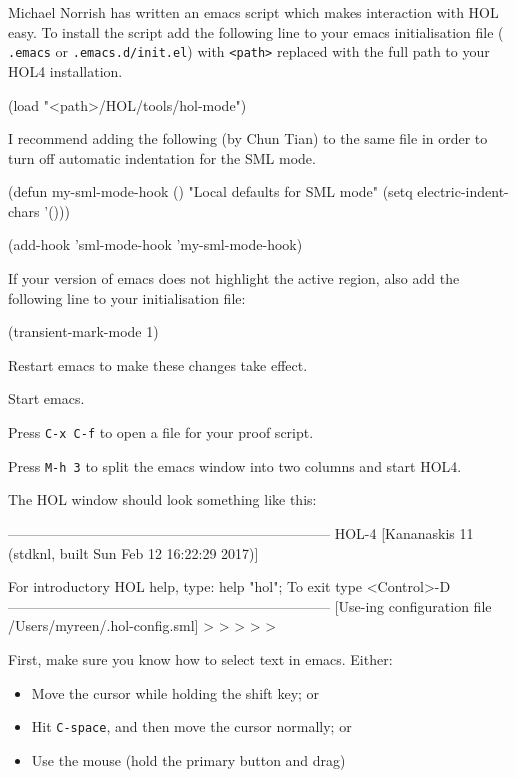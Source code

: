 \documentclass[a4paper,10pt]{article}
\begin{document}

Michael Norrish has written an emacs script which makes interaction
with HOL easy. To install the script add the following line to your emacs initialisation file ({\tt
.emacs} or \texttt{.emacs.d/init.el}) with {\tt <path>} replaced with the full path to your HOL4
installation.
\begin{code}
(load "<path>/HOL/tools/hol-mode")
\end{code}
I recommend adding the following (by Chun Tian) to the same file
in order to turn off automatic indentation for the SML mode.
\begin{code}
(defun my-sml-mode-hook ()
  "Local defaults for SML mode"
  (setq electric-indent-chars '()))

(add-hook 'sml-mode-hook 'my-sml-mode-hook)
\end{code}

If your version of emacs does not highlight the active region, also add the following line
to your initialisation file:
\begin{code}
(transient-mark-mode 1)
\end{code}
Restart emacs to make these changes take effect.


\begin{enum}
\item Start emacs.
\item Press {\tt C-x C-f} to open a file for your proof script.
\item Press {\tt M-h 3} to split the emacs window into two columns and start HOL4.
\end{enum}
The HOL window should look something like this:
\begin{code}
---------------------------------------------------------------------
       HOL-4 [Kananaskis 11 (stdknl, built Sun Feb 12 16:22:29 2017)]

       For introductory HOL help, type: help "hol";
       To exit type <Control>-D
---------------------------------------------------------------------
[Use-ing configuration file /Users/myreen/.hol-config.sml]
> > > > >
\end{code}


First, make sure you know how to select text in emacs. Either:
\begin{itemize}
\item Move the cursor while holding the shift key; or
\item Hit \texttt{C-space}, and then move the cursor normally; or
\item Use the mouse (hold the primary button and drag)
\end{itemize}
\end{document}

